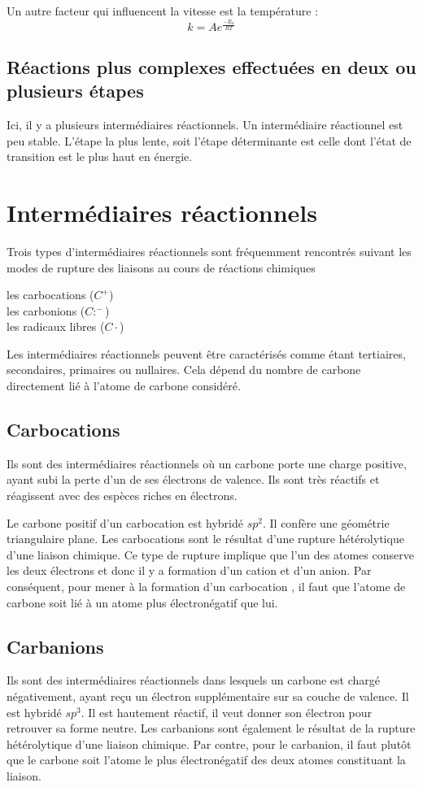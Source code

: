 Un autre facteur qui influencent la vitesse est la température :
$$ k = Ae^{\frac{-E_a}{RT}} $$

\subsection{Réactions plus complexes effectuées en deux ou plusieurs étapes} Ici, il y a plusieurs intermédiaires réactionnels.
Un intermédiaire réactionnel est peu stable.
L'étape la plus lente, soit l'étape déterminante est celle dont l'état de transition est le plus haut en énergie.
\section{Intermédiaires réactionnels }


Trois types d'intermédiaires réactionnels sont fréquemment rencontrés suivant les modes de rupture des liaisons au cours de réactions chimiques
\begin{description}
  \item [les carbocations ($C^+$)]
  \item [les carbonions ($C:^-$)]
  \item [les radicaux libres ($C\cdot$)]
\end{description}
Les intermédiaires réactionnels peuvent être caractérisés comme étant tertiaires, secondaires, primaires ou nullaires.
Cela dépend du nombre de carbone directement lié à l'atome de carbone considéré.

\subsection{Carbocations}
Ils sont des intermédiaires réactionnels où un carbone porte une charge positive, ayant subi la perte d'un de ses électrons de valence.
Ils sont très réactifs et réagissent avec des espèces riches en électrons.

Le carbone positif d'un carbocation est hybridé $sp^2$.
Il confère une géométrie triangulaire plane.
Les carbocations sont le résultat d'une rupture hétérolytique d'une liaison chimique.
Ce type de rupture implique que l'un des atomes  conserve les deux électrons et donc il y a formation d'un cation et d'un anion.
Par conséquent, pour mener à la formation d'un carbocation , il faut que l'atome de carbone soit lié à un atome plus électronégatif que lui.

\subsection{Carbanions}
Ils sont des intermédiaires réactionnels dans lesquels un carbone est chargé négativement, ayant reçu un électron supplémentaire sur sa couche de valence.
Il est hybridé $sp^3$.
Il est hautement réactif, il veut donner son électron pour retrouver sa forme neutre.
Les carbanions sont également le résultat de la rupture hétérolytique d'une liaison chimique.
Par contre, pour le carbanion, il faut plutôt que le carbone soit l'atome le plus électronégatif des deux atomes constituant la liaison.


